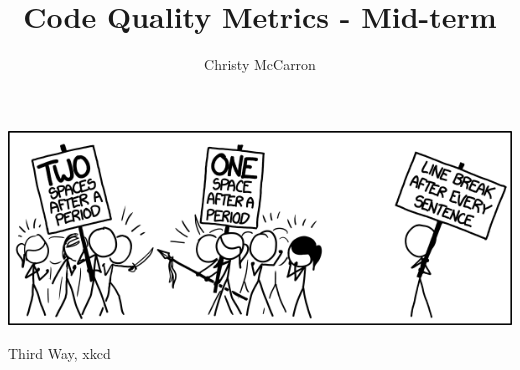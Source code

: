 \documentclass[sigconf, nonacm]{acmart}
\begin{document}
\title{Code Quality Metrics - Mid-term}


\author{Christy McCarron}


\begin{abstract}

\end{abstract}


\begin{teaserfigure}
  \includegraphics[width=\textwidth]{images/third_way.png}
  \caption{Third Way, xkcd}
  \label{fig:thirdWay}
\end{teaserfigure}

\maketitle















\appendix


\end{document}
